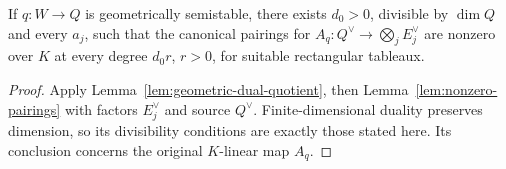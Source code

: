 \begin{corollary}
\label{cor:geometric-quotient-nonzero-pairings}
\leanok
If $q:W\to Q$ is geometrically semistable, there exists $d_0>0$, divisible
by $\dim Q$ and every $a_j$, such that the canonical pairings for
$A_q:Q^\vee\to\bigotimes_jE_j^\vee$ are nonzero over $K$ at every degree
$d_0r$, $r>0$, for suitable rectangular tableaux.
\end{corollary}
\begin{proof}
Apply Lemma~\ref{lem:geometric-dual-quotient}, then
Lemma~\ref{lem:nonzero-pairings} with factors $E_j^\vee$ and source $Q^\vee$.
Finite-dimensional duality preserves dimension, so its divisibility
conditions are exactly those stated here. Its conclusion concerns the
original $K$-linear map $A_q$.
\end{proof}
